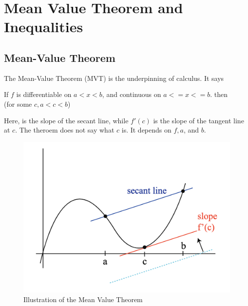 

\chapter{Mean Value Theorem and Inequalities}

\bigbreak

\section{Mean-Value Theorem}

The Mean-Value Theorem (MVT) is the underpinning of calculus. It says
\begin{mdframed}
\begin{center}
    If $f$ is differentiable on $a < x < b$, and continuous on $a <= x <= b$. then \\
     (for some $c, a < c < b$)
\end{center}
\end{mdframed}

Here,  is the slope of the secant line, while $f'(c)$ is the slope of the tangent line at $c$.
The theroem does not say what $c$ is. It depends on $f, a$, and $b$.

\begin{figure}[ht!]
	\centering
	\includegraphics[scale=0.7]{./images/lecture_9_figure_1.png}
	\caption{Illustration of the Mean Value Theorem}
\end{figure}

